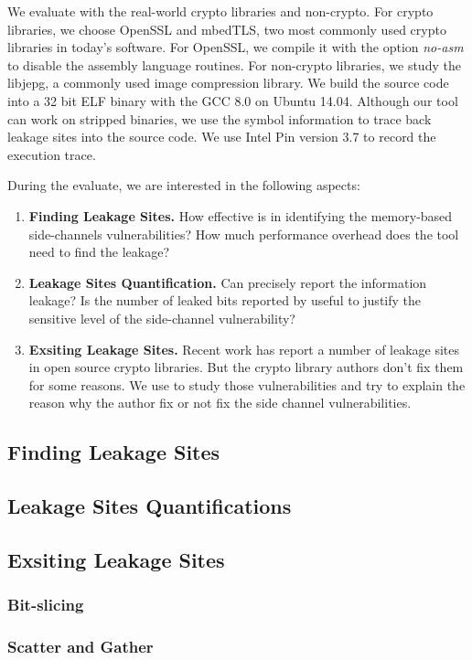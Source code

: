 We evaluate \tool{} with the real-world crypto libraries and non-crypto. 
For crypto libraries, we choose OpenSSL and mbedTLS, two most commonly used
crypto libraries in today's software. For OpenSSL, we compile it with the option \textit{no-asm} 
to disable the assembly language routines. For non-crypto libraries, 
we study the libjepg, a commonly used image compression library. 
We build the source code into a 32 bit 
ELF binary with the GCC 8.0 on Ubuntu 14.04. Although our tool can
work on stripped binaries, we use the symbol information to trace
back leakage sites into the source code. We use Intel Pin version 3.7 
to record the execution trace.


During the evaluate, we are interested in the following aspects:
\begin{enumerate}
    \item \textbf{Finding Leakage Sites.} How effective is \tool{} in 
    identifying the memory-based side-channels vulnerabilities?
    How much performance overhead does the tool need to find the 
    leakage?
    \item \textbf{Leakage Sites Quantification.} Can \tool{} precisely
    report the information leakage? Is the number of leaked bits reported 
    by \tool{} useful to justify the sensitive level of the side-channel
    vulnerability?
    \item \textbf{Exsiting Leakage Sites.} Recent work has report a number
    of leakage sites in open source crypto libraries. But the crypto
    library authors don't fix them for some reasons. We use \tool{} to
    study those vulnerabilities and try to explain the reason why the 
    author fix or not fix the side channel vulnerabilities.
\end{enumerate}


\subsection{Finding Leakage Sites}
\subsection{Leakage Sites Quantifications}
\subsection{Exsiting Leakage Sites}
\subsubsection{Bit-slicing}
\subsubsection{Scatter and Gather}

